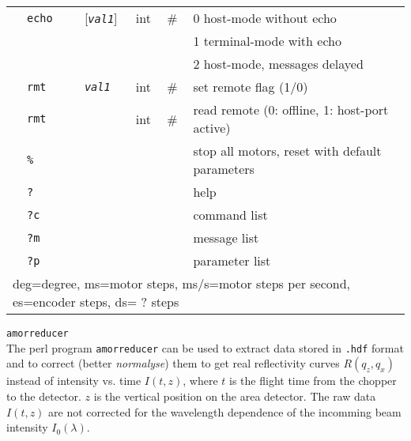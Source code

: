 \documentclass[10pt]{article}
\newcommand{\ts}[1]{\texttt{\textsl{#1}}}
\newcommand{\<}{$<$}
\renewcommand{\>}{\/$>$}
\begin{document}
\begin{table}[b]
\begin{tabular}{l|lcl|lll}
  &\texttt{echo}&       &[\ts{val1}]& int & \#   & 0 host-mode without echo                      \\
  &            &        &           &     &      & 1 terminal-mode with echo                     \\
  &            &        &           &     &      & 2 host-mode, messages delayed                 \\
  &\texttt{rmt}&        & \ts{val1} & int & \#   & set remote flag (1/0)                          \\
  &\texttt{rmt}&        &           & int & \#   & read remote (0: offline, 1: host-port active)   \\
  &\texttt{\%} &        &           &     &      & stop all motors, reset with default parameters \\
  &\texttt{?}  &        &           &     &      & help                                           \\
  &\texttt{?c} &        &           &     &      & command list                                   \\
  &\texttt{?m} &        &           &     &      & message list                                   \\
  &\texttt{?p} &        &           &     &      & parameter list                                 \\
                 \hline
 \multicolumn{7}{l}{deg=degree, ms=motor steps, ms/s=motor steps per second, es=encoder steps,
    ds= ? steps}\\
            \end{tabular}
           \end{table}

\clearpage

\texttt{amorreducer} \\

The perl program \texttt{amorreducer} can be used to extract data 
stored in \texttt{.hdf} format and to correct (better \textsl{normalyse})
them to get real reflectivity curves $R(q_z,q_x)$ instead of 
intensity vs. time $I(t,z)$, where $t$ is the flight time from the
chopper to the detector.  
$z$ is the vertical position on the area detector.
The raw data $I(t,z)$ are not corrected for the
wavelength dependence of the incomming beam intensity $I_0(\lambda)$.  \\
\end{document}
